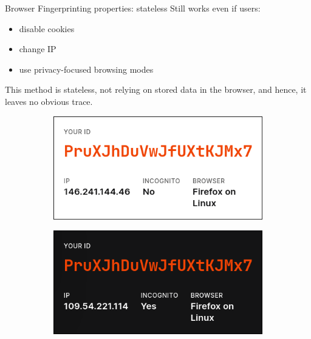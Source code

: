 \begin{frame}{Browser Fingerprinting properties: stateless}
  \vspace{-0.5cm}
  Still works even if users:
  \begin{itemize}
    \item disable cookies
    \item change IP
    \item use privacy-focused browsing modes
  \end{itemize}
  \smallskip
  This method is stateless, not relying on stored data in the browser, and hence, it leaves no obvious trace.

  \begin{figure}
    \centering
    \begin{subfigure}{0.45\textwidth}
      \includegraphics[width=\linewidth]{images/fingerprint-ip-1.png}
    \end{subfigure}
    \begin{subfigure}{0.45\textwidth}
      \includegraphics[width=\linewidth]{images/fingerprint-ip-2.png}
    \end{subfigure}
  \end{figure}
\end{frame}